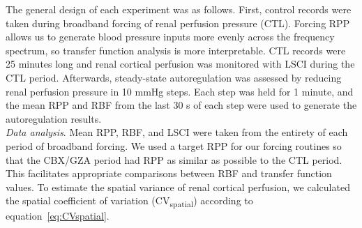 	The general design of each experiment was as follows. First, control records were taken during broadband forcing of renal perfusion pressure (CTL). Forcing RPP allows us to generate blood pressure inputs more evenly across the frequency spectrum, so transfer function analysis is more interpretable. CTL records were 25 minutes long and renal cortical perfusion was monitored with LSCI during the CTL period. Afterwards, steady-state autoregulation was assessed by reducing renal perfusion pressure in 10 mmHg steps. Each step was held for 1 minute, and the mean RPP and RBF from the last 30 s of each step were used to generate the autoregulation results. \\
	\emph{Data analysis}. Mean RPP, RBF, and LSCI were taken from the entirety of each period of broadband forcing. We used a target RPP for our forcing routines so that the CBX/GZA period had RPP as similar as possible to the CTL period. This facilitates appropriate comparisons between RBF and transfer function values. To estimate the spatial variance of renal cortical perfusion, we calculated the spatial coefficient of variation (CV\textsubscript{spatial}) according to equation~\ref{eq:CVspatial}.
	
